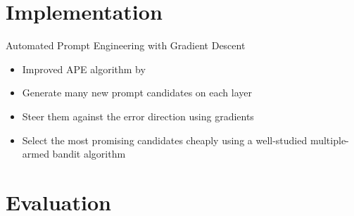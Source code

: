 \documentclass{sdqbeamer}
\begin{document}
\section{Implementation}

\begin{frame}[picture 50 vertical, picture=images/gradient_descent.pdf]{Automated Prompt Engineering with Gradient Descent}
    \begin{itemize}
        \item Improved APE algorithm by \cite{pryzant2023AutomaticPrompt}
        \item Generate many new prompt candidates on each layer
        \item Steer them against the error direction using gradients
        \item Select the most promising candidates cheaply using a well-studied multiple-armed bandit algorithm
    \end{itemize}
    
\end{frame}


\section{Evaluation}
\end{document}
